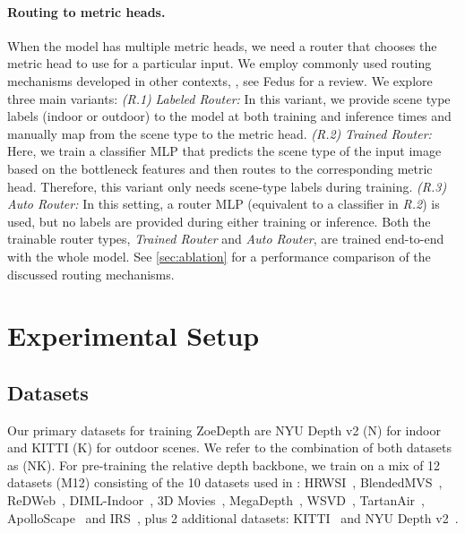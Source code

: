 \documentclass[10pt,twocolumn,letterpaper]{article}
\begin{document}
\paragraph{Routing to metric heads.}
When the model has multiple metric heads, we need a router that chooses the metric head to use for a particular input. We employ commonly used routing mechanisms developed in other contexts, \eg, see Fedus \etal \cite{fedus2022review} for a review. We explore three main variants: {\textit{(R.1)}} \textit{Labeled Router:} In this variant, we provide scene type labels (indoor or outdoor) to the model at both training and inference times and manually map from the scene type to the metric head. {\textit{(R.2)}} \textit{Trained Router:} Here, we train a classifier MLP that predicts the scene type of the input image based on the bottleneck features and then routes to the corresponding metric head. Therefore, this variant only needs scene-type labels during training. {\textit{(R.3)}} \textit{Auto Router:} In this setting, a router MLP (equivalent to a classifier in {\textit{R.2}}) is used, but no labels are provided during either training or inference. Both the trainable router types, \textit{Trained Router} and \textit{Auto Router}, are trained end-to-end with the whole model. See \cref{sec:ablation} for a performance comparison of the discussed routing mechanisms.

\section{Experimental Setup}

\subsection{Datasets}
Our primary datasets for training ZoeDepth are NYU Depth v2 (N) for indoor and KITTI (K) for outdoor scenes. We refer to the combination of both datasets as (NK). For pre-training the relative depth backbone, we train on a mix of 12 datasets (M12) consisting of the 10 datasets used in \cite{Ranftl_2021_ICCV_DPT}: HRWSI~\cite{xian2020structure}, BlendedMVS~\cite{yao2020blendedmvs}, ReDWeb~\cite{xian2018monocular}, DIML-Indoor~\cite{kim2018deep}, 3D Movies~\cite{Ranftl2020MiDaS}, MegaDepth~\cite{MDLi18}, WSVD~\cite{wang2019web}, TartanAir~\cite{wang2020tartanair}, ApolloScape~\cite{huang2019apolloscape} and IRS~\cite{wang2019irs}, plus 2 additional datasets: KITTI~\cite{Menze_2015_CVPR} and NYU Depth v2~\cite{Silberman2012}.
\end{document}
